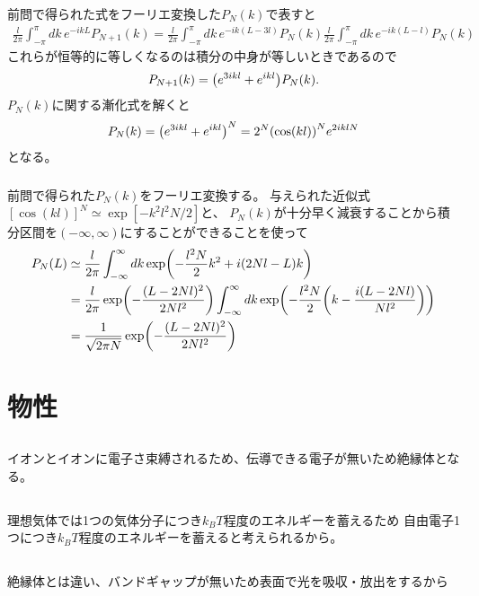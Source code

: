 \documentclass[../../master.tex]{subfiles}
\begin{document}
\subsection{}
前問で得られた式をフーリエ変換した\(P_N(k)\)で表すと
\begin{align}
    \frac{l}{2\pi}\int_{-\pi}^{\pi} dk\, e^{-ikL}P_{N+1}(k)
    = \frac{l}{2\pi}\int_{-\pi}^{\pi} dk\, e^{-ik(L-3l)}P_{N}(k)
    \frac{l}{2\pi}\int_{-\pi}^{\pi} dk\, e^{-ik(L-l)}P_{N}(k)
\end{align}
これらが恒等的に等しくなるのは積分の中身が等しいときであるので
\begin{align}
    P_{N+1}(k) = \qty(e^{3ikl}+e^{ikl})P_N(k).
\end{align}
\(P_N(k)\)に関する漸化式を解くと
\begin{align}
    P_N(k) = \qty(e^{3ikl}+e^{ikl})^{N} = 2^N \qty(\cos(kl))^N e^{2iklN}
\end{align}
となる。
\subsection{}
前問で得られた\(P_N(k)\)をフーリエ変換する。
与えられた近似式\([\cos(kl)]^N\simeq\exp[-k^2l^2N/2]\)と、
\(P_N(k)\)が十分早く減衰することから積分区間を\((-\infty,\infty)\)にすることができることを使って
\begin{align}
    P_N(L) &\simeq \frac{l}{2\pi}\int_{-\infty}^{\infty}dk \exp(-\frac{l^2N}{2}k^2+i(2Nl-L)k)\\
    &= \frac{l}{2\pi}\exp(-\frac{(L-2Nl)^2}{2Nl^2})\int_{-\infty}^{\infty}dk \exp(-\frac{l^2N}{2}\qty(k-\frac{i(L-2Nl)}{Nl^2}))\\
    &= \frac{1}{\sqrt{2\pi N}}\exp(-\frac{(L-2Nl)^2}{2Nl^2})
\end{align}
\chapter{物性}
\section{}
イオンとイオンに電子さ束縛されるため、伝導できる電子が無いため絶縁体となる。
\section{}
理想気体では1つの気体分子につき\(k_BT\)程度のエネルギーを蓄えるため
自由電子1つにつき\(k_BT\)程度のエネルギーを蓄えると考えられるから。
\section{}
絶縁体とは違い、バンドギャップが無いため表面で光を吸収・放出をするから
\end{document}
